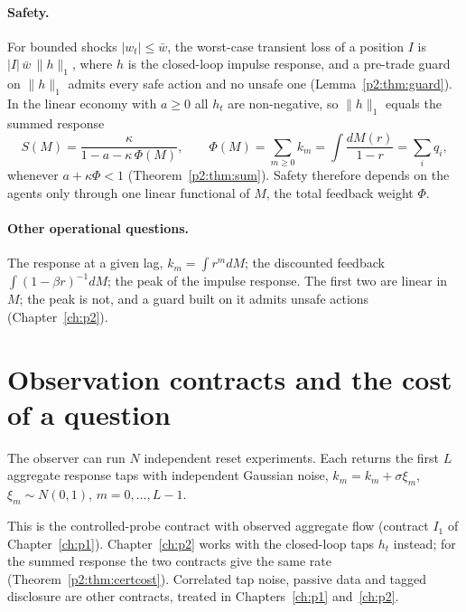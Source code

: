 \paragraph{Safety.} For bounded shocks $|w_t|\le\bar w$, the worst-case transient loss of a position $I$ is $|I|\,\bar w\,\|h\|_1$, where $h$ is the closed-loop impulse response, and a pre-trade guard on $\|h\|_1$ admits every safe action and no unsafe one (Lemma~\ref{p2:thm:guard}). In the linear economy with $a\ge0$ all $h_t$ are non-negative, so $\|h\|_1$ equals the summed response
\begin{equation}\label{eq:fw_S}
S(M)=\frac{\kappa}{1-a-\kappa\,\Phi(M)},\qquad \Phi(M)=\sum_{m\ge0}k_m=\int\frac{dM(r)}{1-r}=\sum_i q_i ,
\end{equation}
whenever $a+\kappa\Phi<1$ (Theorem~\ref{p2:thm:sum}). Safety therefore depends on the agents only through one linear functional of $M$, the total feedback weight $\Phi$.

\paragraph{Other operational questions.} The response at a given lag, $k_m=\int r^m dM$; the discounted feedback $\int (1-\beta r)^{-1}dM$; the peak of the impulse response. The first two are linear in $M$; the peak is not, and a guard built on it admits unsafe actions (Chapter~\ref{ch:p2}).

\section{Observation contracts and the cost of a question}\label{sec:fw_contracts}

\begin{assumption}\label{ass:reset}
The observer can run $N$ independent reset experiments. Each returns the first $L$ aggregate response taps with independent Gaussian noise, $\hat k_m=k_m+\sigma\xi_m$, $\xi_m\sim N(0,1)$, $m=0,\dots,L-1$.
\end{assumption}

This is the controlled-probe contract with observed aggregate flow (contract $I_1$ of Chapter~\ref{ch:p1}). Chapter~\ref{ch:p2} works with the closed-loop taps $h_t$ instead; for the summed response the two contracts give the same rate (Theorem~\ref{p2:thm:certcost}). Correlated tap noise, passive data and tagged disclosure are other contracts, treated in Chapters~\ref{ch:p1} and~\ref{ch:p2}.

